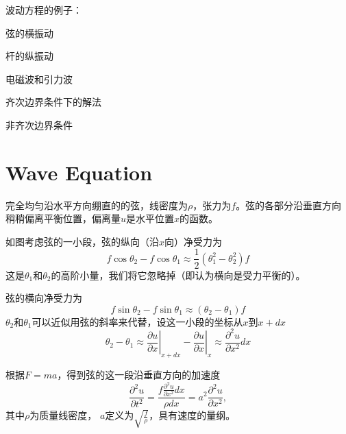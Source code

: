 \documentclass[CJK]{beamer}
\date{}
\begin{document}

\begin{frame}
\bch
\bitem
\item{波动方程的例子：
  \bitem
\item{弦的横振动}
\item{杆的纵振动}
\item{电磁波和引力波}
  \eitem}
\item{齐次边界条件下的解法}
\item{非齐次边界条件}  
\eitem
\ech
\end{frame}


\section{Wave Equation}

\begin{frame}
\bch
完全均匀沿水平方向绷直的的弦，线密度为$\rho$，张力为$f$。弦的各部分沿垂直方向稍稍偏离平衡位置，偏离量$u$是水平位置$x$的函数。


如图考虑弦的一小段，弦的纵向（沿$x$向）净受力为 $$ f \cos\theta_2 - f\cos\theta_1 \approx \frac{1}{2}\left(\theta_1^2-\theta_2^2\right) f $$
这是$\theta_1$和$\theta_2$的高阶小量，我们将它忽略掉（即认为横向是受力平衡的）。

\ech
\end{frame}



\begin{frame}
\bch
{}

弦的横向净受力为 $$ f \sin\theta_2 - f\sin\theta_1 \approx \left(\theta_2-\theta_1\right) f $$
$\theta_2$和$\theta_1$可以近似用弦的斜率来代替，设这一小段的坐标从$x$到$x+dx$
$$\theta_2-\theta_1 \approx \left.\frac{\partial u}{\partial x}\right\vert_{x+dx}-\left.\frac{\partial u}{\partial x}\right\vert_{x} \approx \frac{\partial^2u}{\partial x^2} dx $$

\ech
\end{frame}


\begin{frame}
\bch
{}
根据$F=ma$，得到弦的这一段沿垂直方向的加速度
$$\frac{\partial ^2u}{\partial t^2} = \frac{f\frac{\partial^2u}{\partial x^2} dx}{\rho dx} = a^2 \frac{\partial^2u}{\partial x^2} ,$$
其中$\rho$为质量线密度， $a$定义为$\sqrt{\frac{f}{\rho}}$，具有速度的量纲。

\ech
\end{frame}
\end{document}
